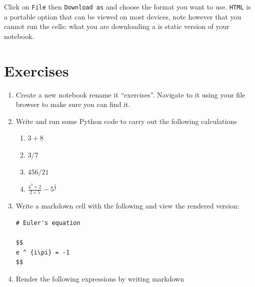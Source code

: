 Click on \texttt{File} then \texttt{Download as} and choose the format you want
to use. \texttt{HTML}
is a portable option that can be viewed on most devices, note however that you
cannot run the cells: what you are downloading a is static version of your
notebook.

\section{Exercises}

\begin{enumerate}

\item 

Create a new notebook rename it “exercises”. Navigate to it using your file browser to make sure you can find it.

\item 

Write and run some Python code to carry out the following calculations
\begin{enumerate}

\item 

\(3 + 8\)

\item 

\(3 / 7\)

\item 

\(456 / 21\)

\item 

\(\frac{4 ^ 3 + 2}{2\times 5} - 5 ^ {\frac{1}{2}}\)

\end{enumerate}

\item 

Write a markdown cell with the following and view the rendered version:

\begin{verbatim}
# Euler's equation

$$
e ^ {i\pi} = -1
$$
\end{verbatim}

\item 

Render the following expressions by writing markdown
\begin{enumerate}


\end{enumerate}
\end{enumerate}
